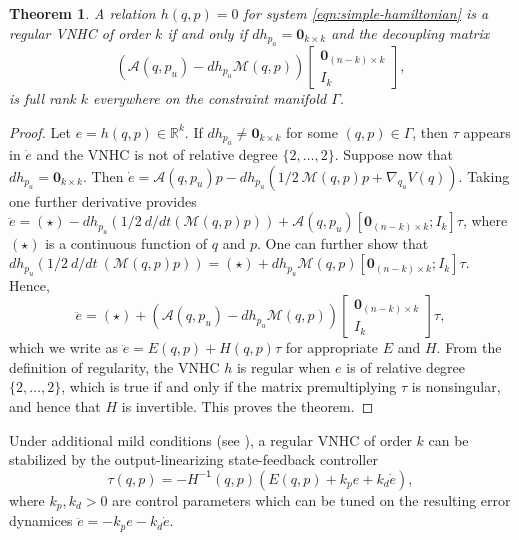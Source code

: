 \documentclass[journal,twoside,web, onecolumn, draftcls]{ieeecolor}
\newtheorem{thm}{Theorem}%
\newcommand*{\inv}{^\mathsf{-1}}
\newcommand*{\R}{\mathbb{R}}
\newcommand*{\Id}[1]{I_{#1}}
\newcommand*{\Zmat}[1]{\bm{0}_{#1}}
\newcommand*{\simpleB}{\begin{bmatrix}\Zmat{(n-k)\times k}\\ \Id{k}\end{bmatrix}}
\begin{document}
\begin{thm}\label{thm:vnhc-regularity}
    A relation \(h(q,p) = 0\) for system \eqref{eqn:simple-hamiltonian}
    is a regular VNHC of order \(k\) if and only if 
    \(dh_{p_a} = \Zmat{k \times k}\) 
    and the decoupling matrix
    \begin{equation}\label{eqn:decoupling-matrix}
        \left(\mathcal{A}(q,p_u) - dh_{p_u}\mathcal{M}(q,p)\right)\simpleB
         ,
     \end{equation}
    is full rank \(k\) everywhere on the constraint manifold \(\Gamma\).
\end{thm}
\begin{proof}
    Let \(e = h(q,p) \in \R^k\).
    If \(dh_{p_a} \neq \Zmat{k\times k}\) for some \((q,p) \in \Gamma\), 
    then \(\tau\) appears in \(\dot{e}\) and the VNHC is not of relative degree
    \(\{2,\ldots,2\}\). Suppose now that \(dh_{p_a} = \Zmat{k\times k}\).
    Then 
    \(\dot{e} = \mathcal{A}(q,p_u)p - 
     dh_{p_u}\left(1/2~\mathcal{M}(q,p)p + \nabla_{q_u}V(q)\right)\).
    Taking one further derivative provides
    \( \ddot{e} = (\star) - 
        dh_{p_u}\left(1/2~d/dt\left(\mathcal{M}(q,p)p\right)\right) 
        + \mathcal{A}(q,p_u)[\Zmat{(n-k)\times k};\Id{k}] \tau\),
    where \((\star)\) is a continuous function of \(q\) and \(p\).
    One can further show that
    \(dh_{p_u}\left(1/2~d/dt~\left(\mathcal{M}(q,p)p\right)\right)
        = (\star) + dh_{p_u}\mathcal{M}(q,p)[\Zmat{(n-k)\times k};
        \Id{k}]\tau\).
    Hence,
    \[
       \ddot{e} = (\star) +
       \left(\mathcal{A}(q,p_u) - dh_{p_u}\mathcal{M}(q,p)\right) \simpleB \tau
        ,
    \]
    which we write as \( \ddot{e} = E(q,p) + H(q,p)\tau\) for appropriate \(E\)
    and \(H\).
    From the definition of regularity, the VNHC \(h\) is regular 
    when \(e\) is of relative degree \(\{2,\ldots,2\}\), which is true 
    if and only if the matrix premultiplying \(\tau\) is nonsingular, and hence
    that \(H\) is invertible. This proves the theorem.
\end{proof}

Under additional mild conditions (see \cite{vhcs_for_el_systems}), a regular VNHC of
order \(k\) can be stabilized by the output-linearizing state-feedback
controller
\begin{equation}\label{eqn:stabilizing-controller}
    \tau(q,p) = -H\inv(q,p)\left(E(q,p) + k_p e + k_d \dot{e}\right)
    ,
\end{equation}
where \(k_p, k_d > 0\) are control parameters which can be tuned on the
resulting error dynamices \(\ddot{e} = -k_p e - k_d \dot{e}\).
\end{document}
